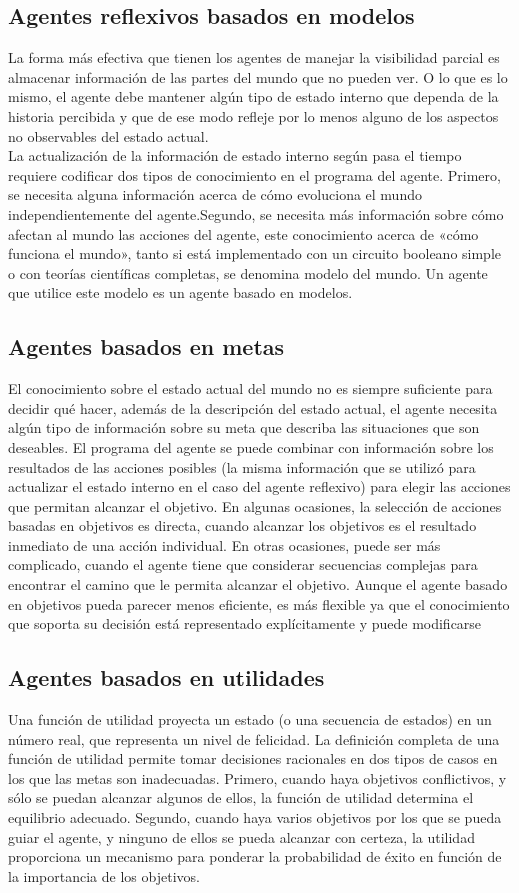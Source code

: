 \documentclass[12pt,a4paper]{report}
\begin{document}
\subsection*{Agentes reflexivos basados en modelos}
La forma más efectiva que tienen los agentes de manejar la visibilidad parcial es almacenar información de las partes del mundo que no pueden ver. O lo que es lo mismo, el agente debe mantener algún tipo de estado interno que dependa de la historia percibida y que de ese modo refleje por lo menos alguno de los aspectos no observables del estado actual.\\La actualización de la información de estado interno según pasa el tiempo requiere codificar dos tipos de conocimiento en el programa del agente. Primero, se necesita alguna información acerca de cómo evoluciona el mundo independientemente del agente.Segundo, se necesita más información sobre cómo afectan al mundo las acciones del agente, este conocimiento acerca de «cómo funciona el mundo», tanto si está implementado con un circuito booleano simple o con teorías científicas completas, se denomina modelo del mundo. Un agente que utilice este modelo es un agente basado en modelos.
\subsection*{Agentes basados en metas}
El conocimiento sobre el estado actual del mundo no es siempre suficiente para decidir qué hacer, además de la descripción del estado actual, el agente necesita algún tipo de información sobre su meta que describa las situaciones que son deseables. El programa del agente se puede combinar con información sobre los resultados de las acciones posibles (la misma información que se utilizó para actualizar el estado interno en el caso del agente reflexivo) para elegir las acciones que permitan alcanzar el objetivo. En algunas ocasiones, la selección de acciones basadas en objetivos es directa, cuando alcanzar los objetivos es el resultado inmediato de una acción individual. En otras ocasiones, puede ser más complicado, cuando el agente tiene que considerar secuencias complejas para encontrar el camino que le permita alcanzar el objetivo. Aunque el agente basado en objetivos pueda parecer menos eficiente, es más flexible ya que el conocimiento que soporta su decisión está representado explícitamente y puede modificarse
\subsection*{Agentes basados en utilidades}
Una función de utilidad proyecta un estado (o una secuencia de estados) en un número real, que representa un nivel de felicidad. La definición completa de una función de utilidad permite tomar decisiones racionales en dos tipos de casos en los que las metas son inadecuadas. Primero, cuando haya objetivos conflictivos, y sólo se puedan alcanzar algunos de ellos, la función de utilidad determina el equilibrio adecuado. Segundo, cuando haya varios objetivos por los que se pueda guiar el agente, y ninguno de ellos se pueda alcanzar con certeza, la utilidad proporciona un mecanismo para ponderar la probabilidad de éxito en función de la importancia de los objetivos.
\end{document}
